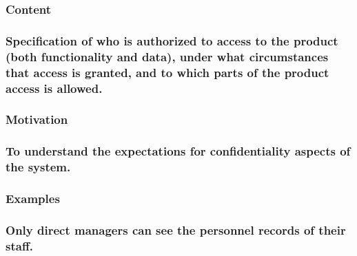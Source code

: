 \documentclass[
]{article}
\begin{document}
\hypertarget{content-52}{%
\subsubsection{Content}\label{content-52}}

\hypertarget{specification-of-who-is-authorized-to-access-to-the-product-both-functionality-and-data-under-what-circumstances-that-access-is-granted-and-to-which-parts-of-the-product-access-is-allowed.}{%
\subsubsection{\texorpdfstring{Specification of who is authorized to
access to the product (both functionality and data), under what
circumstances that access is granted, and to which parts of the product
access is allowed.
}{Specification of who is authorized to access to the product (both functionality and data), under what circumstances that access is granted, and to which parts of the product access is allowed. }}\label{specification-of-who-is-authorized-to-access-to-the-product-both-functionality-and-data-under-what-circumstances-that-access-is-granted-and-to-which-parts-of-the-product-access-is-allowed.}}

\hypertarget{motivation-51}{%
\subsubsection{Motivation}\label{motivation-51}}

\hypertarget{to-understand-the-expectations-for-confidentiality-aspects-of-the-system.}{%
\subsubsection{To understand the expectations for confidentiality
aspects of the
system.}\label{to-understand-the-expectations-for-confidentiality-aspects-of-the-system.}}

\hypertarget{examples-35}{%
\subsubsection{Examples}\label{examples-35}}

\hypertarget{only-direct-managers-can-see-the-personnel-records-of-their-staff.}{%
\subsubsection{Only direct managers can see the personnel records of
their
staff.}\label{only-direct-managers-can-see-the-personnel-records-of-their-staff.}}
\end{document}
